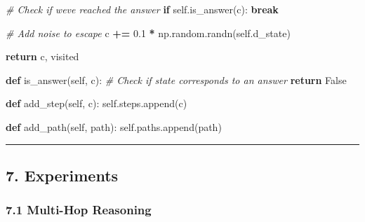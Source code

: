 \documentclass[
  11pt,
  a4paper,
]{article}
\newenvironment{Shaded}{\begin{snugshade}}{\end{snugshade}}
\newcommand{\CommentTok}[1]{\textcolor[rgb]{0.56,0.35,0.01}{\textit{#1}}}
\newcommand{\ControlFlowTok}[1]{\textcolor[rgb]{0.13,0.29,0.53}{\textbf{#1}}}
\newcommand{\FloatTok}[1]{\textcolor[rgb]{0.00,0.00,0.81}{#1}}
\newcommand{\KeywordTok}[1]{\textcolor[rgb]{0.13,0.29,0.53}{\textbf{#1}}}
\newcommand{\NormalTok}[1]{#1}
\newcommand{\OperatorTok}[1]{\textcolor[rgb]{0.81,0.36,0.00}{\textbf{#1}}}
\newcommand{\VariableTok}[1]{\textcolor[rgb]{0.00,0.00,0.00}{#1}}
\begin{document}
\begin{Shaded}
\begin{Highlighting}[]
            \CommentTok{\# Check if we\textquotesingle{}ve reached the answer}
            \ControlFlowTok{if} \VariableTok{self}\NormalTok{.is\_answer(c):}
                \ControlFlowTok{break}
            
            \CommentTok{\# Add noise to escape}
\NormalTok{            c }\OperatorTok{+=} \FloatTok{0.1} \OperatorTok{*}\NormalTok{ np.random.randn(}\VariableTok{self}\NormalTok{.d\_state)}
        
        \ControlFlowTok{return}\NormalTok{ c, visited}
    
    \KeywordTok{def}\NormalTok{ is\_answer(}\VariableTok{self}\NormalTok{, c):}
        \CommentTok{\# Check if state corresponds to an answer}
        \ControlFlowTok{return} \VariableTok{False}
    
    \KeywordTok{def}\NormalTok{ add\_step(}\VariableTok{self}\NormalTok{, c):}
        \VariableTok{self}\NormalTok{.steps.append(c)}
    
    \KeywordTok{def}\NormalTok{ add\_path(}\VariableTok{self}\NormalTok{, path):}
        \VariableTok{self}\NormalTok{.paths.append(path)}
\end{Highlighting}
\end{Shaded}

\begin{center}\rule{0.5\linewidth}{0.5pt}\end{center}

\subsection{7. Experiments}\label{experiments}

\subsubsection{7.1 Multi-Hop Reasoning}\label{multi-hop-reasoning-2}
\end{document}

